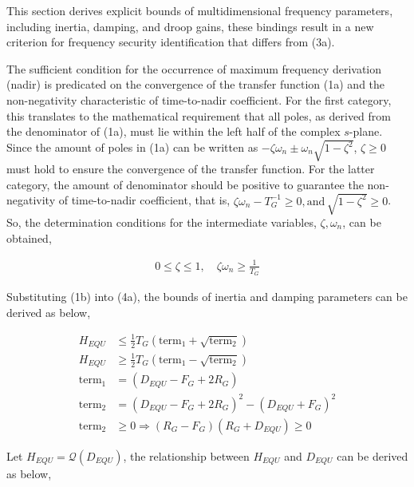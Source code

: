 \documentclass[lettersize,journal]{IEEEtran}
\begin{document}
This section derives explicit bounds of multidimensional frequency parameters, including inertia, damping, and droop gains, these bindings result in a new criterion for frequency security identification that differs from (3a).

The sufficient condition for the occurrence of maximum frequency derivation (nadir) is predicated on the convergence of the transfer function (1a) and the non-negativity characteristic of time-to-nadir coefficient. For the first category, this translates to the mathematical requirement that all poles, as derived from the denominator of (1a), must lie within the left half of the complex $s$-plane. Since the amount of poles in (1a) can be written as $-\zeta \omega_n \pm \omega_n \sqrt{1 - \zeta^2}$, $\zeta \geq 0$ must hold to ensure the convergence of the transfer function. For the latter category, the amount of denominator should be positive to guarantee the non-negativity of time-to-nadir coefficient, that is, $\zeta \omega_n - T_G^{-1}\geq 0, \text{and}\, \sqrt{1-\zeta^2} \geq 0$. So, the determination conditions for the intermediate variables, $\zeta, \omega_n$, can be obtained,

\begin{subequations}
  \begin{align}
    0 \leq \zeta \leq 1, \quad \zeta \omega_n \geq \frac{1}{T_G} \label{eq:zeta_wn}
    \end{align}
  \end{subequations}

Substituting (1b) into (4a), the bounds of inertia and damping parameters can be derived as below,

\begin{subequations}
  \begin{align}
    H_{EQU} &\leq \frac{1}{2}T_G \left(\text{term}_1 + \sqrt{\text{term}_2} \right) \\
    H_{EQU} &\geq \frac{1}{2}T_G \left(\text{term}_1 - \sqrt{\text{term}_2} \right) \\
    \text{term}_1 &= (D_{EQU} - F_G + 2R_G) \\
    \text{term}_2 &= {(D_{EQU} - F_G + 2R_G)^2 - (D_{EQU} + F_G)^2}\\
    \text{term}_2 &\geq 0 \Longrightarrow (R_G - F_G)(R_G + D_{EQU}) \geq 0
    \end{align}
  \end{subequations}

Let $H_{EQU}=\mathcal{Q} (D_{EQU})$, the relationship between $H_{EQU}$ and $D_{EQU}$ can be derived as below,
\end{document}
